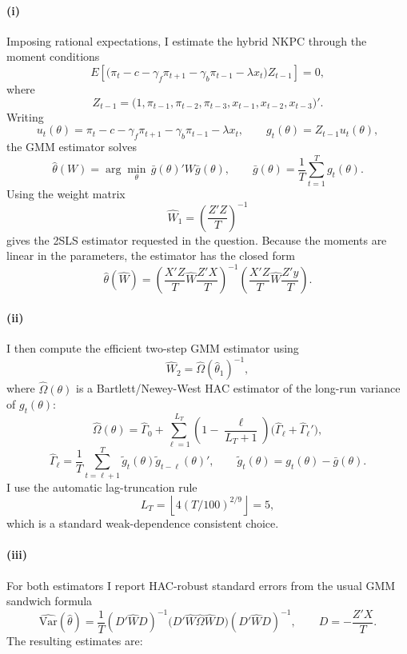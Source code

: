 \documentclass[11pt]{article}
\newcommand{\QSixBandwidth}{5}
\begin{document}
\paragraph{(i)}
Imposing rational expectations, I estimate the hybrid NKPC through the moment conditions
\[
E\!\left[\bigl(\pi_t-c-\gamma_f\pi_{t+1}-\gamma_b\pi_{t-1}-\lambda x_t\bigr)Z_{t-1}\right]=0,
\]
where
\[
Z_{t-1}=\bigl(1,\pi_{t-1},\pi_{t-2},\pi_{t-3},x_{t-1},x_{t-2},x_{t-3}\bigr)'.
\]
Writing
\[
u_t(\theta)=\pi_t-c-\gamma_f\pi_{t+1}-\gamma_b\pi_{t-1}-\lambda x_t,
\qquad
g_t(\theta)=Z_{t-1}u_t(\theta),
\]
the GMM estimator solves
\[
\widehat{\theta}(W)=\arg\min_{\theta}\,\bar g(\theta)'W\bar g(\theta),
\qquad
\bar g(\theta)=\frac{1}{T}\sum_{t=1}^{T} g_t(\theta).
\]
Using the weight matrix
\[
\widehat W_1=\left(\frac{Z'Z}{T}\right)^{-1}
\]
gives the 2SLS estimator requested in the question. Because the moments are linear in the parameters, the estimator has the closed form
\[
\widehat\theta(\widehat W)
=
\left(\frac{X'Z}{T}\widehat W\frac{Z'X}{T}\right)^{-1}
\left(\frac{X'Z}{T}\widehat W\frac{Z'y}{T}\right).
\]

\paragraph{(ii)}
I then compute the efficient two-step GMM estimator using
\[
\widehat W_2=\widehat\Omega(\widehat\theta_1)^{-1},
\]
where \(\widehat\Omega(\theta)\) is a Bartlett/Newey-West HAC estimator of the long-run variance of \(g_t(\theta)\):
\[
\widehat\Omega(\theta)
=
\widehat\Gamma_0
+
\sum_{\ell=1}^{L_T}
\left(1-\frac{\ell}{L_T+1}\right)\bigl(\widehat\Gamma_\ell+\widehat\Gamma_\ell'\bigr),
\]
\[
\widehat\Gamma_\ell
=
\frac{1}{T}\sum_{t=\ell+1}^{T}\tilde g_t(\theta)\tilde g_{t-\ell}(\theta)',
\qquad
\tilde g_t(\theta)=g_t(\theta)-\bar g(\theta).
\]
I use the automatic lag-truncation rule
\[
L_T=\left\lfloor 4(T/100)^{2/9}\right\rfloor=\QSixBandwidth,
\]
which is a standard weak-dependence consistent choice.

\paragraph{(iii)}
For both estimators I report HAC-robust standard errors from the usual GMM sandwich formula
\[
\widehat{\mathrm{Var}}(\widehat\theta)
=
\frac{1}{T}
(D'\widehat W D)^{-1}
\bigl(D'\widehat W\widehat\Omega \widehat W D\bigr)
(D'\widehat W D)^{-1},
\qquad
D=-\frac{Z'X}{T}.
\]
The resulting estimates are:
\end{document}
